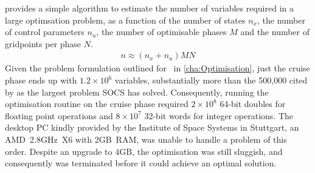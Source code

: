 



\textcite{Betts1998} provides a simple algorithm to estimate the number of variables required in a large optimsation problem, as a function of the number of states $n_x$, the number of control parameters $n_u$, the number of optimisable phases $M$ and the number of gridpoints per phase $N$.
\begin{gather}
n \approx (n_x + n_u)MN %
\end{gather} %
Given the problem formulation outlined for \BW\ in \autoref{cha:Optimisation}, just the cruise phase ends up with $1.2\times10^6$ variables, substantially more than the 500,000 cited by \textcite{ASTOS_guide} as the largest problem SOCS has solved. Consequently, running the optimisation routine on the cruise phase required $2\times10^8$ 64-bit doubles for floating point operations and $8\times10^7$ 32-bit words for integer operations. The desktop PC kindly provided by the Institute of Space Systems in Stuttgart, an AMD~2.8GHz~X6 with 2GB~RAM, was unable to handle a problem of this order. Despite an upgrade to 4GB, the optimisation was still sluggish, and consequently was terminated before it could achieve an optimal solution. 


